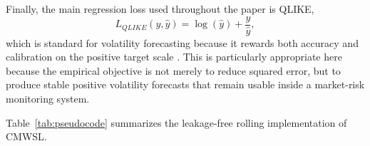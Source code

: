 Finally, the main regression loss used throughout the paper is QLIKE,
\[
L_{QLIKE}(y,\hat y)=\log(\hat y)+\frac{y}{\hat y},
\]
which is standard for volatility forecasting because it rewards both accuracy and calibration on the positive target scale \cite{patton2011proxy}. This is particularly appropriate here because the empirical objective is not merely to reduce squared error, but to produce stable positive volatility forecasts that remain usable inside a market-risk monitoring system.



Table~\ref{tab:pseudocode} summarizes the leakage-free rolling implementation of CMWSL.
